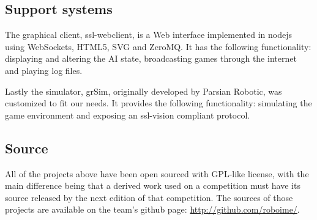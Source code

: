 \subsection{Support systems}

The graphical client, ssl-webclient, is a Web interface implemented in nodejs using WebSockets, HTML5, SVG and ZeroMQ.
It has the following functionality: displaying and altering the AI state, broadcasting games through the internet and playing log files.

Lastly the simulator, grSim, originally developed by Parsian Robotic, was customized to fit our needs.
It provides the following functionality: simulating the game environment and exposing an ssl-vision compliant protocol.

\subsection{Source}

All of the projects above have been open sourced with GPL-like license, with the main difference being that a derived work used on a competition must have its source released by the next edition of that competition. The sources of those projects are available on the team's github page: \url{http://github.com/roboime/}.
